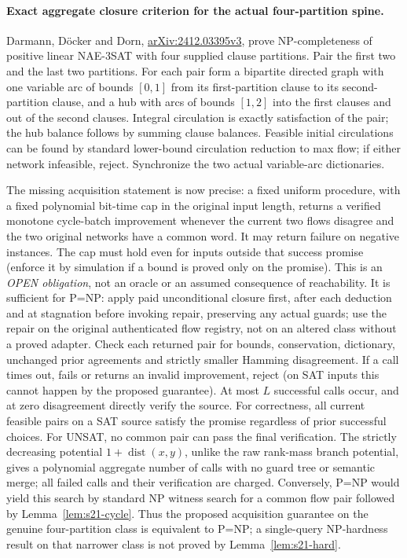 \documentclass[11pt]{article}
\begin{document}
\paragraph{Exact aggregate closure criterion for the actual four-partition spine.}
Darmann, D\"ocker and Dorn, \href{https://arxiv.org/abs/2412.03395v3}{arXiv:2412.03395v3}, prove NP-completeness of positive linear NAE-3SAT with four supplied clause partitions. Pair the first two and the last two partitions. For each pair form a bipartite directed graph with one variable arc of bounds $[0,1]$ from its first-partition clause to its second-partition clause, and a hub with arcs of bounds $[1,2]$ into the first clauses and out of the second clauses. Integral circulation is exactly satisfaction of the pair; the hub balance follows by summing clause balances. Feasible initial circulations can be found by standard lower-bound circulation reduction to max flow; if either network infeasible, reject. Synchronize the two actual variable-arc dictionaries.

The missing acquisition statement is now precise: a fixed uniform procedure, with a fixed polynomial bit-time cap in the original input length, returns a verified monotone cycle-batch improvement whenever the current two flows disagree and the two original networks have a common word. It may return failure on negative instances. The cap must hold even for inputs outside that success promise (enforce it by simulation if a bound is proved only on the promise). This is an \emph{OPEN obligation}, not an oracle or an assumed consequence of reachability. It is sufficient for P=NP: apply paid unconditional closure first, after each deduction and at stagnation before invoking repair, preserving any actual guards; use the repair on the original authenticated flow registry, not on an altered class without a proved adapter. Check each returned pair for bounds, conservation, dictionary, unchanged prior agreements and strictly smaller Hamming disagreement. If a call times out, fails or returns an invalid improvement, reject (on SAT inputs this cannot happen by the proposed guarantee). At most $L$ successful calls occur, and at zero disagreement directly verify the source. For correctness, all current feasible pairs on a SAT source satisfy the promise regardless of prior successful choices. For UNSAT, no common pair can pass the final verification. The strictly decreasing potential $1+\operatorname{dist}(x,y)$, unlike the raw rank-mass branch potential, gives a polynomial aggregate number of calls with no guard tree or semantic merge; all failed calls and their verification are charged. Conversely, P=NP would yield this search by standard NP witness search for a common flow pair followed by Lemma~\ref{lem:s21-cycle}. Thus the proposed acquisition guarantee on the genuine four-partition class is equivalent to P=NP; a single-query NP-hardness result on that narrower class is not proved by Lemma~\ref{lem:s21-hard}.
\end{document}

